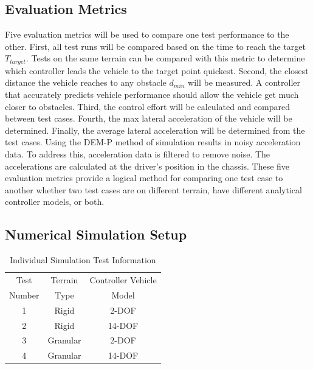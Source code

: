 \documentclass[12pt,twocolumn]{article}
\begin{document}


\subsection{Evaluation Metrics}\label{ss:Metrics}
Five evaluation metrics will be used to compare one test performance to the other. First, all test runs will be compared based on the time to reach the target $T_{target}$. Tests on the same terrain can be compared with this metric to determine which controller leads the vehicle to the target point quickest. Second, the closest distance the vehicle reaches to any obstacle $d_{min}$ will be measured. A controller that accurately predicts vehicle performance should allow the vehicle get much closer to obstacles. Third, the control effort will be calculated and compared between test cases. Fourth, the max lateral acceleration of the vehicle will be determined. Finally, the average lateral acceleration will be determined from the test cases. Using the DEM-P method of simulation results in noisy acceleration data. To address this, acceleration data is filtered to remove noise. The accelerations are calculated at the driver's position in the chassis. These five evaluation metrics provide a logical method for comparing one test case to another whether two test cases are on different terrain, have different analytical controller models, or both. 


\subsection{Numerical Simulation Setup }\label{ss:Setup}

\begin{table}
\begin{center}
	\begin{tabular}{||c |c | c||} 
		\hline
		Test  & Terrain  & Controller Vehicle \\
		Number &  Type & Model\\ [0.5ex] 	
		\hline\hline
		1 & Rigid & 2-DOF \\ 
		\hline
		2 & Rigid & 14-DOF \\
		\hline
		3 & Granular & 2-DOF \\
		\hline
		4 & Granular & 14-DOF \\
		\hline
	\end{tabular}
\end{center}
\caption{Individual Simulation Test Information}
\label{t:TestMatrix}
\end{table}
\end{document}
